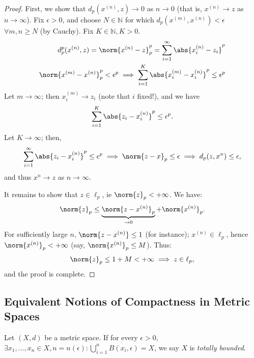 \begin{proof}
    First, we show that $d_p(x^{(n)}, z) \to 0$ as $n \to 0$ (that is, $x^{(n)} \to z$ as $n \to \infty$). Fix $\epsilon >0$, and choose $N \in \mathbb{N}$ for which $d_p(x^{(m)}, x^{(n)} )< \epsilon$ $\forall m, n \geq N$ (by Cauchy). Fix $K \in \mathbb{N}, K > 0$.
    \begin{align*}
        d_p^p(x^{(n)}, z) = \norm{x^{(n)} - z}_p^p = \sum_{i=1}^\infty \abs{x_i^{(n)} - z_i}^{p}\\
        \norm{x^{(m)} - x^{(n)}}_p^p < \epsilon^p \implies \sum_{i=1}^K\abs{x_i^{(m)} - x_i^{(n)}}^p \leq \epsilon^p
    \end{align*}
    Let $m \to \infty$; then $x_i^{(m)} \to z_i$ (note that $i$ fixed!), and we have \begin{align*}
        \sum_{i=1}^K\abs{z_i - x_i^{(n)}}^p \leq \epsilon^p.
    \end{align*}
    Let $K \to \infty$; then, 
    \begin{align*}
        \sum_{i=1}^\infty \abs{z_i - x_i^{(n)}}^p \leq \epsilon^p\implies \norm{z - x}_p \leq \epsilon\implies d_p(z, x^{n}) \leq \epsilon,
    \end{align*}
    and thus $x^{n} \to z$ as $n \to \infty$. 

    It remains to show that $z \in \ell_p$, ie $\norm{z}_p < + \infty$. We have:
    \begin{align*}
        \norm{z}_p \leq \underbrace{\norm{z - x^{(n)}}_p}_{\to 0} + \norm{x^{(n)}}_p.
    \end{align*}
    For sufficiently large $n$, $\norm{z - x^{(n)}} \leq 1$ (for instance); $x^{(n)} \in \ell_p$, hence $\norm{x^{(n)}}_p < + \infty$ (say, $\norm{x^{(n)}}_p \leq M$). Thus:\begin{align*}
        \norm{z}_p \leq 1 + M < + \infty \implies z \in \ell_p,
    \end{align*}
    and the proof is complete.
\end{proof}

\subsection{Equivalent Notions of Compactness in Metric Spaces}
\begin{definition}
    Let $(X,d)$ be a metric space. If for every $\epsilon > 0$, $\exists x_1, \dots, x_n \in X, n = n(\epsilon) : \bigcup_{i=1}^n B(x_i, \epsilon) = X$, we say $X$ is \emph{totally bounded}.
\end{definition}
